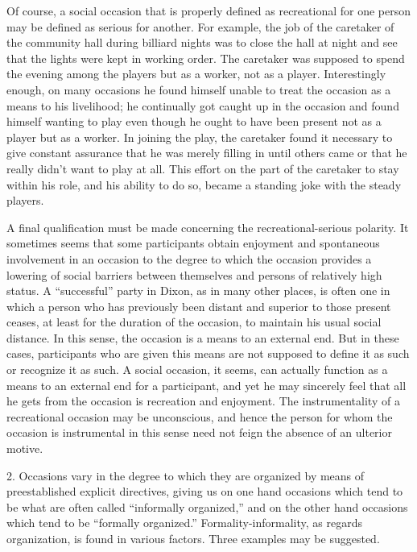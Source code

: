 \documentclass[openany,nobib]{tufte-book}
\begin{document}
Of course, a social occasion that is properly defined as recreational
for one person may be defined as serious for another. For example, the
job of the caretaker of the community hall during billiard nights was to
close the hall at night and see that the lights were kept in working
order. The caretaker was supposed to spend the evening among the players
but as a worker, not as a player. Interestingly enough, on many
occasions he found himself unable to treat the occasion as a means to
his livelihood; he continually got caught up in the occasion and found
himself wanting to play even though he ought to have been present not as
a player but as a worker. In joining the play, the caretaker found it
necessary to give constant assurance that he was merely filling in until
others came or that he really didn't want to play at all. This effort on
the part of the caretaker to stay within his role, and his ability to do
so, became a standing joke with the steady players.

A final qualification must be made concerning the recreational-serious
polarity. It sometimes seems that some participants obtain enjoyment and
spontaneous involvement in an occasion to the degree to which the
occasion provides a lowering of social barriers between themselves and
persons of relatively high status. A ``successful'' party in Dixon, as
in many other places, is often one in which a person who has previously
been distant and superior to those present ceases, at least for the
duration of the occasion, to maintain his usual social distance. In this
sense, the occasion is a means to an external end. But in these cases,
participants who are given this means are not supposed to define it as
such or recognize it as such. A social occasion, it seems, can actually
function as a means to an external end for a participant, and yet he may
sincerely feel that all he gets from the occasion is recreation and
enjoyment. The instrumentality of a recreational occasion may be
unconscious, and hence the person for whom the occasion is instrumental
in this sense need not feign the absence of an ulterior motive.

2. Occasions vary in the degree to which they are organized by means of
preestablished explicit directives, giving us on one hand occasions
which tend to be what are often called ``informally organized,'' and on
the other hand occasions which tend to be ``formally organized.''
Formality-informality, as regards organization, is found in various
factors. Three examples may be suggested.
\end{document}
